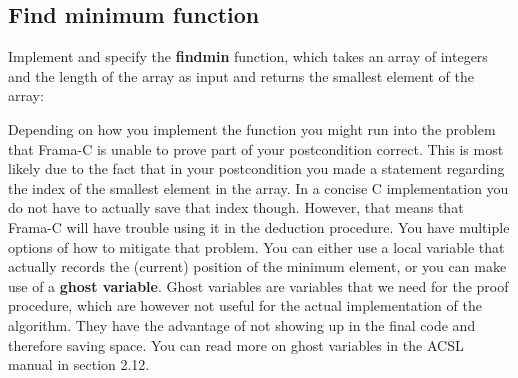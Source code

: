 \subsection{Find minimum function}

Implement and specify the \textbf{find\textunderscore min} function, which takes an array of integers and the length of the array as input and returns the smallest element of the array: 


Depending on how you implement the function you might run into the problem that Frama-C is unable to prove part of your postcondition correct. This is most likely due to the fact that in your postcondition you made a statement regarding the index of the smallest element in the array. In a concise C implementation you do not have to actually save that index though. However, that means that Frama-C will have trouble using it in the deduction procedure. You have multiple options of how to mitigate that problem. You can either use a local variable that actually records the (current) position of the minimum element, or you can make use of a \textbf{ghost variable}. Ghost variables are variables that we need for the proof procedure, which are however not useful for the actual implementation of the algorithm. They have the advantage of not showing up in the final code and therefore saving space. You can read more on ghost variables in the ACSL manual \cite{baudin_acsl_nodate} in section 2.12. 
